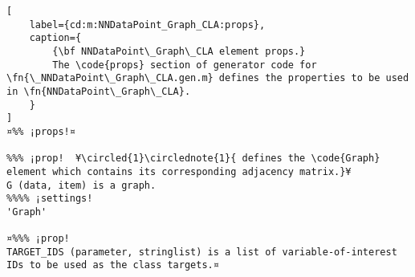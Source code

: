 \documentclass{tufte-handout}
\begin{document}
\begin{lstlisting}[
	label={cd:m:NNDataPoint_Graph_CLA:props},
	caption={
		{\bf NNDataPoint\_Graph\_CLA element props.}
		The \code{props} section of generator code for \fn{\_NNDataPoint\_Graph\_CLA.gen.m} defines the properties to be used in \fn{NNDataPoint\_Graph\_CLA}.
	}
]
¤%% ¡props!¤

%%% ¡prop!  ¥\circled{1}\circlednote{1}{ defines the \code{Graph} element which contains its corresponding adjacency matrix.}¥
G (data, item) is a graph.
%%%% ¡settings!
'Graph'

¤%%% ¡prop!
TARGET_IDS (parameter, stringlist) is a list of variable-of-interest IDs to be used as the class targets.¤

\end{lstlisting}

\clearpage
\end{document}
